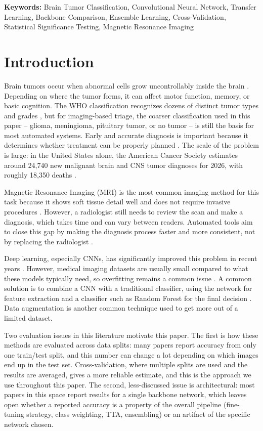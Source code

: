 \documentclass[11pt]{article}
\begin{document}
\noindent\textbf{Keywords:} Brain Tumor Classification, Convolutional Neural Network, Transfer Learning, Backbone Comparison, Ensemble Learning, Cross-Validation, Statistical Significance Testing, Magnetic Resonance Imaging

\section{Introduction}
\label{sec:intro}

Brain tumors occur when abnormal cells grow uncontrollably inside the brain \cite{dorfner2025review}. Depending on where the tumor forms, it can affect motor function, memory, or basic cognition. The WHO classification recognizes dozens of distinct tumor types and grades \cite{louis2021who}, but for imaging-based triage, the coarser classification used in this paper -- glioma, meningioma, pituitary tumor, or no tumor -- is still the basis for most automated systems. Early and accurate diagnosis is important because it determines whether treatment can be properly planned \cite{dorfner2025review}. The scale of the problem is large: in the United States alone, the American Cancer Society estimates around 24,740 new malignant brain and CNS tumor diagnoses for 2026, with roughly 18,350 deaths \cite{acs2026braintumor}.

Magnetic Resonance Imaging (MRI) is the most common imaging method for this task because it shows soft tissue detail well and does not require invasive procedures \cite{dorfner2025review}. However, a radiologist still needs to review the scan and make a diagnosis, which takes time and can vary between readers. Automated tools aim to close this gap by making the diagnosis process faster and more consistent, not by replacing the radiologist \cite{karagoz2024resvit}.

Deep learning, especially CNNs, has significantly improved this problem in recent years \cite{dorfner2025review, kaifi2024enhancing}. However, medical imaging datasets are usually small compared to what these models typically need, so overfitting remains a common issue \cite{karagoz2024resvit}. A common solution is to combine a CNN with a traditional classifier, using the network for feature extraction and a classifier such as Random Forest for the final decision \cite{alzoghby2023dual}. Data augmentation is another common technique used to get more out of a limited dataset.

Two evaluation issues in this literature motivate this paper. The first is how these methods are evaluated across data splits: many papers report accuracy from only one train/test split, and this number can change a lot depending on which images end up in the test set. Cross-validation, where multiple splits are used and the results are averaged, gives a more reliable estimate, and this is the approach we use throughout this paper. The second, less-discussed issue is architectural: most papers in this space report results for a single backbone network, which leaves open whether a reported accuracy is a property of the overall pipeline (fine-tuning strategy, class weighting, TTA, ensembling) or an artifact of the specific network chosen.
\end{document}
